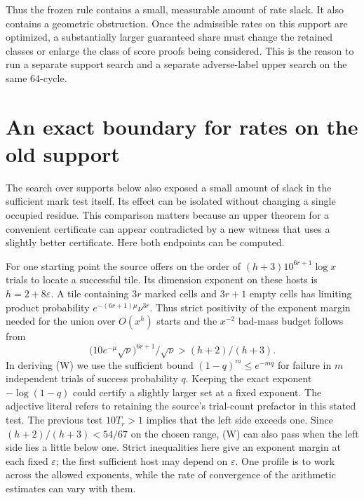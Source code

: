 \documentclass[12pt,letterpaper]{article}
\begin{document}
Thus the frozen rule contains a small, measurable amount of rate slack. It also contains a geometric obstruction. Once the admissible rates on this support are optimized, a substantially larger guaranteed share must change the retained classes or enlarge the class of score proofs being considered. This is the reason to run a separate support search and a separate adverse-label upper search on the same 64-cycle.
\section{An exact boundary for rates on the old support}
The search over supports below also exposed a small amount of slack in the sufficient mark test itself. Its effect can be isolated without changing a single occupied residue. This comparison matters because an upper theorem for a convenient certificate can appear contradicted by a new witness that uses a slightly better certificate. Here both endpoints can be computed.

For one starting point the source offers on the order of \((h+3)10^{6r+1}\log x\) trials to locate a successful tile. Its dimension exponent on these hosts is \(h=2+8\varepsilon\). A tile containing \(3r\) marked cells and \(3r+1\) empty cells has limiting product probability \(e^{-(6r+1)\mu}\nu^{3r}\). Thus strict positivity of the exponent margin needed for the union over \(O(x^h)\) starts and the \(x^{-2}\) bad-mass budget follows from
\[
 \bigl(10e^{-\mu}\sqrt{\nu}\bigr)^{6r+1}/\sqrt{\nu}
               > (h+2)/(h+3).                             \tag{W}
\]
In deriving (W) we use the sufficient bound \((1-q)^m\le e^{-mq}\) for failure in \(m\) independent trials of success probability \(q\). Keeping the exact exponent \(-\log(1-q)\) could certify a slightly larger set at a fixed exponent. The adjective literal refers to retaining the source's trial-count prefactor in this stated test. The previous test \(10T_r>1\) implies that the left side exceeds one. Since \((h+2)/(h+3)<54/67\) on the chosen range, (W) can also pass when the left side lies a little below one. Strict inequalities here give an exponent margin at each fixed \(\varepsilon\); the first sufficient host may depend on \(\varepsilon\). One profile is to work across the allowed exponents, while the rate of convergence of the arithmetic estimates can vary with them.
\end{document}
